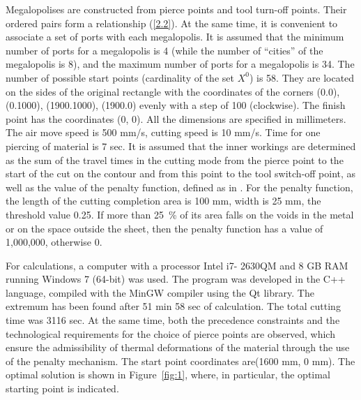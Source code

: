 \documentclass[numbers,sort&compress]{IntechOpen-Book}%
\begin{document}
Megalopolises are constructed from pierce points and tool turn-off points.
Their ordered pairs form a relationship (\ref{2.2}).
At the same time,
it is convenient to associate a set of ports with each megalopolis.
It is assumed that the minimum number of ports for a megalopolis is 4
(while the number of ``cities'' of the megalopolis is 8),
and the maximum number of ports for a megalopolis is 34.
The number of possible start points
(cardinality of the set $ X ^ 0 $)
is 58.
They are located on the sides of the original rectangle
with the coordinates of the corners
(0.0), (0.1000), (1900.1000), (1900.0)
evenly with a step of 100
(clockwise).
The finish point has the coordinates (0, 0).
All the dimensions are specified in millimeters.
The air move speed is 500 mm/s,
cutting speed is 10 mm/s.
Time for one piercing of material is 7 sec. 
It is assumed that the inner workings are determined
as the sum of the travel times in the cutting mode
from the pierce point to the start of the cut on the contour
and from this point to
the tool switch-off point,
as well as the value of the penalty function,
defined as in
\cite{18}.
For the penalty function,
the length of the cutting completion area is 100 mm,
width is 25 mm,
the threshold value 0.25.
If more than 25~\% of its area
falls on the voids in the metal or on the space outside the sheet,
then the penalty function has a value of 1,000,000, otherwise 0.

For calculations, a computer with a processor Intel i7-
2630QM and 8 GB RAM running Windows 7 (64-bit) was used. 
The program was developed in the C++ language,
compiled with the MinGW compiler using the Qt library.
The extremum  has been found after 51 min 58 sec of calculation.  The total cutting time was 3116 sec.
At the same time, 
both the precedence constraints and the technological requirements for the choice of pierce points are observed, 
which ensure the admissibility of thermal deformations of the material  through the use of the penalty mechanism.
The start point coordinates are(1600 mm, 0 mm).
The optimal solution is shown in Figure~\ref{fig:1},
where, in particular, the optimal starting point is indicated.

\begin{figure}
  \centering
\end{figure}
\end{document}
